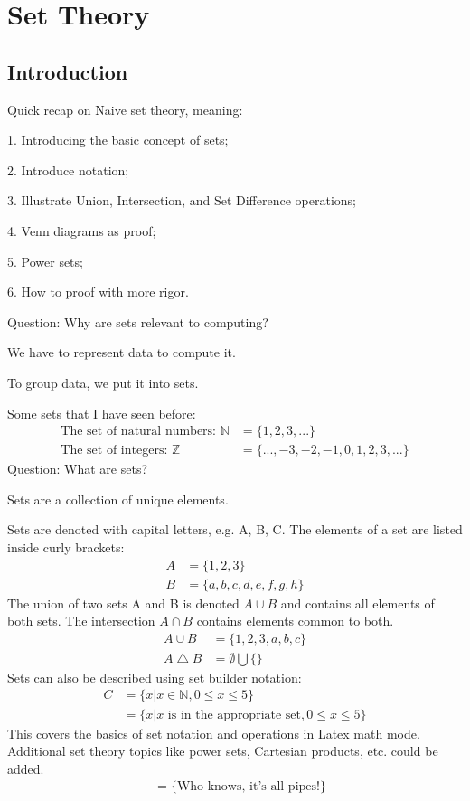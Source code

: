 \documentclass{article}
\begin{document}
\section{Set Theory}
\subsection{Introduction}
Quick recap on Naive set theory, meaning:

1. Introducing the basic concept of sets;

2. Introduce notation;

3. Illustrate Union, Intersection, and Set Difference operations;

4. Venn diagrams as proof;

5. Power sets;

6. How to proof with more rigor.

Question: Why are sets relevant to computing?

We have to represent data to compute it.

To group data, we put it into sets.

Some sets that I have seen before:
\begin{align*}
    \text{The set of natural numbers: } \mathbb{N} & = \{1, 2, 3, ...\}                    \\
    \text{The set of integers: } \mathbb{Z}        & = \{..., -3, -2, -1, 0, 1, 2, 3,...\}
\end{align*}
Question: What are sets?

Sets are a collection of unique elements.

Sets are denoted with capital letters, e.g. A, B, C. The elements of a set are listed inside curly brackets:
\begin{align*}
    A & = \{1, 2, 3\}                \\
    B & = \{a, b, c, d, e, f, g, h\}
\end{align*}
The union of two sets A and B is denoted $A \cup B$ and contains all elements of both sets. The intersection $A \cap B$ contains elements common to both.
\begin{align*}
    A \cup B           & = \{1, 2, 3, a, b, c\}   \\
    A \bigtriangleup B & = \emptyset \bigcup \{\}
\end{align*}
Sets can also be described using set builder notation:
\begin{align*}
    C & = \{x | x \in \mathbb{N}, 0 \leq x \leq 5\}                    \\
      & = \{x |\text{$x$ is in the appropriate set}, 0 \leq x \leq 5\}
\end{align*}
This covers the basics of set notation and operations in Latex math mode. Additional set theory topics like power sets, Cartesian products, etc. could be added.
\begin{align*}
     & = \{\text{Who knows, it's all pipes!}\}
\end{align*}
\end{document}
